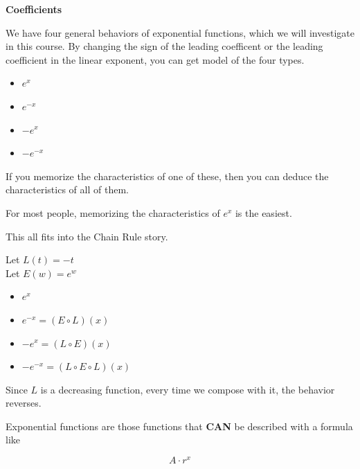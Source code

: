 \documentclass{ximera}
\begin{document}
\begin{idea} \textbf{\textcolor{blue!55!black}{Coefficients}}


We have four general behaviors of exponential functions, which we will investigate in this course. By changing the sign of the leading coefficent or the leading coefficient in the linear exponent, you can get model of the four types.  


\begin{itemize}
\item $e^x$
\item $e^{-x}$
\item $-e^x$
\item $-e^{-x}$
\end{itemize}


If you memorize the characteristics of one of these, then you can deduce the characteristics of all of them. 

For most people, memorizing the characteristics of $e^x$ is the easiest.



This all fits into the Chain Rule story.

Let $L(t) = -t$ \\
Let $E(w) = e^w$


\begin{itemize}
\item $e^x$
\item $e^{-x} = (E \circ L)(x)$
\item $-e^x = (L \circ E)(x)$
\item $-e^{-x} = (L \circ E \circ L)(x)$
\end{itemize}


Since $L$ is a decreasing function, every time we compose with it, the behavior reverses.




\end{idea}





















Exponential functions are those functions that \textbf{\textcolor{purple!85!blue}{CAN}} be described with a formula like 

\[
A \cdot r^x
\]
\end{document}
